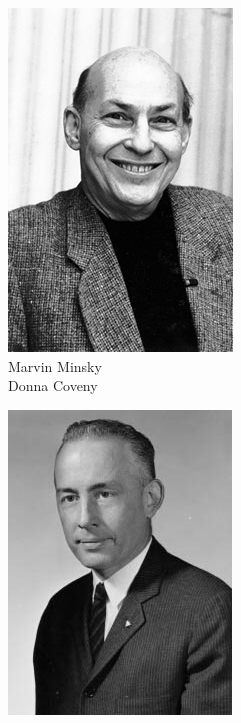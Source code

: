 \begin{frame}[t]
{\begin{minipage}[t]{\textwidth}
		\begin{minipage}[t]{0.24\textwidth}
			\centering
			\begin{figure}[ht]
				\includegraphics[width=.6\textwidth]{img/Marvin-Misky.png}
				{\tiny\\Marvin Minsky\\\textcopyright Donna Coveny}
			\end{figure}
		\end{minipage}
		\begin{minipage}[t]{0.24\textwidth}
			\centering
			\begin{figure}[ht]
				\includegraphics[width=.68\textwidth]{img/Nathaniel-Rochester.jpeg}

\end{figure}
\end{minipage}
\end{minipage}}
\end{frame}
